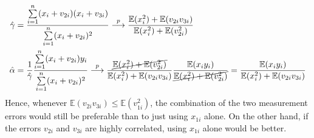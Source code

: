 \documentclass[]{article}
\begin{document}
\begin{equation}
	\begin{split}
		\hat{\gamma}& = \frac{\sum\limits_{i = 1}^n (x_i + v_{2i})(x_i + v_{3i})}{\sum\limits_{i = 1}^n (x_i + v_{2i})^2}\overset{p}{\longrightarrow} \frac{\mathbb{E}(x_i^2) + \mathbb{E}(v_{2i}v_{3i})}{\mathbb{E}(x_i^2) + \mathbb{E}(v_{2i}^2)} \\ \nonumber
		\hat{\alpha}& = \frac{1}{\hat{\gamma}}\frac{\sum\limits_{i = 1}^n(x_i + v_{2i})y_i}{\sum\limits_{i = 1}^n(x_i + v_{2i})^2} \overset{p}{\longrightarrow}\frac{\cancel{\mathbb{E}(x_i^2) + \mathbb{E}(v_{2i}^2)}}{\mathbb{E}(x_i^2) + \mathbb{E}(v_{2i}v_{3i})}\frac{\mathbb{E}(x_iy_i)}{\cancel{\mathbb{E}(x_i^2) + \mathbb{E}(v_{2i}^2)}} = \frac{\mathbb{E}(x_iy_i)}{\mathbb{E}(x_i^2) + \mathbb{E}(v_{2i}v_{3i})}
	\end{split}
\end{equation}
Hence, whenever $\mathbb{E}(v_{2i}v_{3i})\leq\mathbb{E}(v_{1i}^2)$, the combination of the two measurement errors would still be preferable than to just using $x_{1i}$ alone. On the other hand, if the errors $v_{2i}$ and $v_{3i}$ are highly correlated, using $x_{1i}$ alone would be better.
\end{document}
